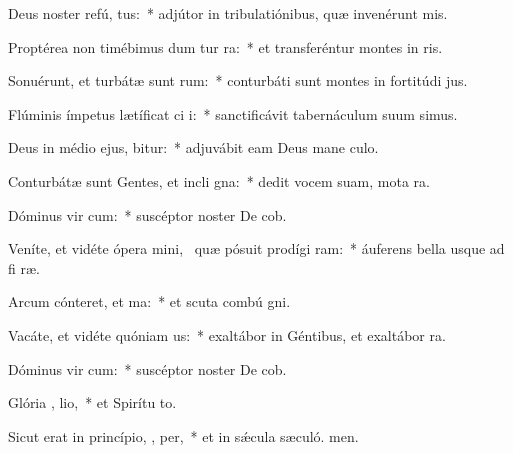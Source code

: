 \item Deus noster refú,  tus:~* adjútor in tribulatiónibus, quæ invenérunt  mis.
\item Proptérea non timébimus dum tur ra:~* et transferéntur montes in  ris.
\item Sonuérunt, et turbátæ sunt  rum:~* conturbáti sunt montes in fortitúdi jus.
\item Flúminis ímpetus lætíficat ci i:~* sanctificávit tabernáculum suum simus.
\item Deus in médio ejus,  bitur:~* adjuvábit eam Deus mane culo.
\item Conturbátæ sunt Gentes, et incli  gna:~* dedit vocem suam, mota  ra.
\item Dóminus vir cum:~* suscéptor noster De cob.
\item Veníte, et vidéte ópera mini,~\pscross{} quæ pósuit prodígi  ram:~* áuferens bella usque ad fi ræ.
\item Arcum cónteret, et  ma:~* et scuta combú gni.
\item Vacáte, et vidéte quóniam   us:~* exaltábor in Géntibus, et exaltábor  ra.
\item Dóminus vir cum:~* suscéptor noster De cob.
\item Glória ,  lio,~* et Spirítu to.
\item Sicut erat in princípio,  ,  per,~* et in sǽcula sæculó. men.
